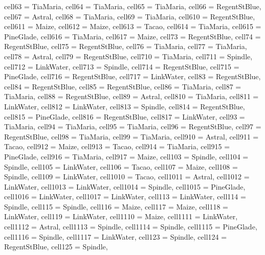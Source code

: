 \begin{table}
\begin{tblr}[
  label = none,
  entry = none,
]
{  cell{6}{3} = {TiaMaria},
  cell{6}{4} = {TiaMaria},
  cell{6}{5} = {TiaMaria},
  cell{6}{6} = {RegentStBlue},
  cell{6}{7} = {Astral},
  cell{6}{8} = {TiaMaria},
  cell{6}{9} = {TiaMaria},
  cell{6}{10} = {RegentStBlue},
  cell{6}{11} = {Maize},
  cell{6}{12} = {Maize},
  cell{6}{13} = {Tacao},
  cell{6}{14} = {TiaMaria},
  cell{6}{15} = {PineGlade},
  cell{6}{16} = {TiaMaria},
  cell{6}{17} = {Maize},
  cell{7}{3} = {RegentStBlue},
  cell{7}{4} = {RegentStBlue},
  cell{7}{5} = {RegentStBlue},
  cell{7}{6} = {TiaMaria},
  cell{7}{7} = {TiaMaria},
  cell{7}{8} = {Astral},
  cell{7}{9} = {RegentStBlue},
  cell{7}{10} = {TiaMaria},
  cell{7}{11} = {Spindle},
  cell{7}{12} = {LinkWater},
  cell{7}{13} = {Spindle},
  cell{7}{14} = {RegentStBlue},
  cell{7}{15} = {PineGlade},
  cell{7}{16} = {RegentStBlue},
  cell{7}{17} = {LinkWater},
  cell{8}{3} = {RegentStBlue},
  cell{8}{4} = {RegentStBlue},
  cell{8}{5} = {RegentStBlue},
  cell{8}{6} = {TiaMaria},
  cell{8}{7} = {TiaMaria},
  cell{8}{8} = {RegentStBlue},
  cell{8}{9} = {Astral},
  cell{8}{10} = {TiaMaria},
  cell{8}{11} = {LinkWater},
  cell{8}{12} = {LinkWater},
  cell{8}{13} = {Spindle},
  cell{8}{14} = {RegentStBlue},
  cell{8}{15} = {PineGlade},
  cell{8}{16} = {RegentStBlue},
  cell{8}{17} = {LinkWater},
  cell{9}{3} = {TiaMaria},
  cell{9}{4} = {TiaMaria},
  cell{9}{5} = {TiaMaria},
  cell{9}{6} = {RegentStBlue},
  cell{9}{7} = {RegentStBlue},
  cell{9}{8} = {TiaMaria},
  cell{9}{9} = {TiaMaria},
  cell{9}{10} = {Astral},
  cell{9}{11} = {Tacao},
  cell{9}{12} = {Maize},
  cell{9}{13} = {Tacao},
  cell{9}{14} = {TiaMaria},
  cell{9}{15} = {PineGlade},
  cell{9}{16} = {TiaMaria},
  cell{9}{17} = {Maize},
  cell{10}{3} = {Spindle},
  cell{10}{4} = {Spindle},
  cell{10}{5} = {LinkWater},
  cell{10}{6} = {Tacao},
  cell{10}{7} = {Maize},
  cell{10}{8} = {Spindle},
  cell{10}{9} = {LinkWater},
  cell{10}{10} = {Tacao},
  cell{10}{11} = {Astral},
  cell{10}{12} = {LinkWater},
  cell{10}{13} = {LinkWater},
  cell{10}{14} = {Spindle},
  cell{10}{15} = {PineGlade},
  cell{10}{16} = {LinkWater},
  cell{10}{17} = {LinkWater},
  cell{11}{3} = {LinkWater},
  cell{11}{4} = {Spindle},
  cell{11}{5} = {Spindle},
  cell{11}{6} = {Maize},
  cell{11}{7} = {Maize},
  cell{11}{8} = {LinkWater},
  cell{11}{9} = {LinkWater},
  cell{11}{10} = {Maize},
  cell{11}{11} = {LinkWater},
  cell{11}{12} = {Astral},
  cell{11}{13} = {Spindle},
  cell{11}{14} = {Spindle},
  cell{11}{15} = {PineGlade},
  cell{11}{16} = {Spindle},
  cell{11}{17} = {LinkWater},
  cell{12}{3} = {Spindle},
  cell{12}{4} = {RegentStBlue},
  cell{12}{5} = {Spindle},
}
\end{tblr}
\end{table}
